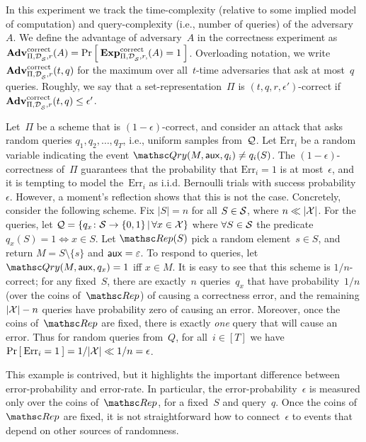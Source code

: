 In this experiment we track the time-complexity (relative to some
implied model of computation) and query-complexity (i.e., number of
queries) of the adversary~$A$.  
We define the advantage of adversary~$A$ in the correctness experiment as 
$\mathrm{\mathbf{Adv}}^{\mathrm{correct}}_{\Pi,\mathcal{D}_{{\cal S}}^{},r}(A) = \Pr\left[\: \mathrm{\mathbf{Exp}}^{\mathrm{correct}}_{\Pi,\mathcal{D}_{{\cal S}}^{}, r,}(A)=1 \:\right]$.
Overloading notation, we write $\mathrm{\mathbf{Adv}}^{\mathrm{correct}}_{\Pi,\mathcal{D}_{{\cal S}}^{},r}(t,q)$ for the maximum over all~$t$-time adversaries that ask at most~$q$ queries. Roughly, we say that a
set-representation~$\Pi$ is $(t,q,r,\epsilon')$-correct if $\mathrm{\mathbf{Adv}}^{\mathrm{correct}}_{\Pi,\mathcal{D}_{{\cal S}}^{},r}(t,q) \leq \epsilon'$.  

\def\bin{{\sf Bin}}
Let~$\Pi$ be a scheme that is $(1-\epsilon)$-correct, and consider an attack that 
asks random queries $q_1,q_2,\ldots,q_T$, i.e., uniform samples from~${\cal Q}$.
Let $\mathrm{Err}_i$ be a random variable indicating the event $\Qry(M,\aux,q_i)\neq q_i(S)$.  
The $(1-\epsilon)$-correctness of~$\Pi$ guarantees that the probability that $\mathrm{Err}_i=1$ is at most~$\epsilon$, 
and it is tempting to model the~$\mathrm{Err}_i$ as i.i.d. Bernoulli trials with success probability~$\epsilon$.
However, a moment's reflection shows that this is not the case.  Concretely, consider the following scheme.  Fix $|S|=n$ for all $S \in {\cal S}$, where $n \ll |{\cal X}|$.  For the queries, let ${\cal Q} = \{q_x\colon {\cal S} \to \{0,1\} \,|\, \forall x \in {\cal X}\}$ where $\forall S \in {\cal S}$ the predicate $q_x(S)=1 \Leftrightarrow x \in S$.  Let $\Rep(S)$ pick a random element~$s \in S$, and return $M = S \setminus \{s\}$ and ${\sf aux} = \varepsilon$.  To respond to queries, let~$\Qry(M,\aux,q_x)=1$ iff $x \in M$.  It is easy to see that this scheme is $1/n$-correct; for any fixed~$S$, there are exactly~$n$ queries~$q_x$ that have probability~$1/n$  (over the coins of~$\Rep$) of causing a correctness error, and the remaining $|{\cal X}|-n$ queries have probability zero of causing an error.  Moreover, once the coins of~$\Rep$ are fixed, there is exactly \emph{one} query that will cause an error.  Thus for random queries from~$Q$, for all~$i\in[T]$ we have $\Pr\left[\: \mathrm{Err}_i=1 \:\right]=1/|{\cal X}| \ll 1/n = \epsilon$.

This example is contrived, but it highlights the important difference
between error-probability and error-rate.  In particular, the
error-probability~$\epsilon$ is measured only over the coins
of~$\Rep$, for a fixed~$S$ and query~$q$.
Once the coins of~$\Rep$ are fixed, it is not straightforward how to
connect~$\epsilon$ to events that depend on other sources of
randomness. 


